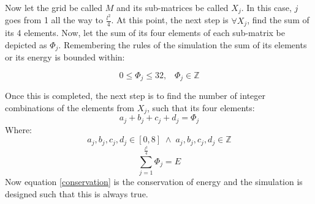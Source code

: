 \pagebreak
Now let the grid be called $M$ and its sub-matrices be called $X_{j}$. In this case, $j$ goes from 1 all the way to $\frac{l^2}{4}$. At this point, the next step is $\forall X_{j}$, find the sum of its 4 elements. Now, let the sum of its four elements of each sub-matrix be depicted as $\Phi_{j}$. Remembering the rules of the simulation the sum of its elements or its energy is bounded within: 

$$0\leq \Phi_{j} \leq 32, \;\;\; \Phi_{j} \in \mathbb{Z} $$

Once this is completed, the next step is to find the number of integer combinations of the elements from $X_{j}$, such that its four elements:
\begin{equation}
    a_{j}+b_{j}+c_{j}+d_{j}=\Phi_{j}
    \label{each}
\end{equation}
Where: 
$$a_{j},b_{j},c_{j},d_{j} \in [0,8] \; 	\land \; a_{j},b_{j},c_{j},d_{j} \in \mathbb{Z}$$
\begin{equation}
    \sum_{j=1}^{\frac{l^2}{4}} \Phi_{j} = E
    \label{conservation}
\end{equation}
Now equation \ref{conservation} is the conservation of energy and the simulation is designed such that this is always true. \par


